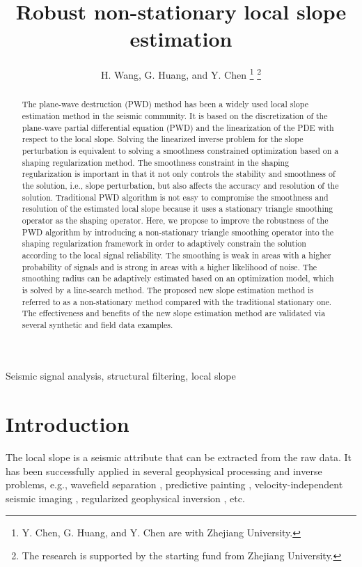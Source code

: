 \title{Robust non-stationary local slope estimation}
\renewcommand{\thefootnote}{\fnsymbol{footnote}}
\author{H. Wang, G. Huang, and Y. Chen
\thanks{Y. Chen, G. Huang, and Y. Chen are with Zhejiang University.}
\thanks{The research is supported by the starting fund from Zhejiang University.}}
\maketitle

\begin{abstract}
The plane-wave destruction (PWD) method has been a widely used local slope estimation method in the seismic community. It is based on the discretization of the plane-wave partial differential equation (PWD) and the linearization of the PDE with respect to the local slope. Solving the linearized inverse problem for the slope perturbation is equivalent to solving a smoothness constrained optimization based on a shaping regularization method. The smoothness constraint in the shaping regularization is important in that it not only controls the stability and smoothness of the solution, i.e., slope perturbation, but also affects the accuracy and resolution of the solution. Traditional PWD algorithm is not easy to compromise the smoothness and resolution of the estimated local slope because it uses a stationary triangle smoothing operator as the shaping operator. Here, we propose to improve the robustness of the PWD algorithm by introducing a non-stationary triangle smoothing operator into the shaping regularization framework in order to adaptively constrain the solution according to the local signal reliability. The smoothing is weak in areas with a higher probability of signals and is strong in areas with a higher likelihood of noise. The smoothing radius can be adaptively estimated based on an optimization model, which is solved by a line-search method. The proposed new slope estimation method is referred to as a non-stationary method compared with the traditional stationary one. The effectiveness and benefits of the new slope estimation method are validated via several synthetic and field data examples.
\end{abstract}

\begin{keywords}
Seismic signal analysis, structural filtering, local slope
\end{keywords}

\section{Introduction}
The local slope is a seismic attribute that can be extracted from the raw data. It has been successfully applied in several geophysical processing and inverse problems, e.g., wavefield separation \cite{harlan1984signal,fomel2002pwd}, predictive painting \cite{fomel2010predictive}, velocity-independent seismic imaging \cite{fomel2007velocity}, regularized geophysical inversion \cite{fomel2007shape}, etc. 


